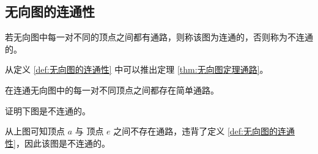 \begin{collections}
\begin{solution}
\begin{center}
            \hspace{3em}
        \end{center}
    \end{solution}
\end{collections}

\subsection{无向图的连通性}
\begin{definition}[无向图的连通性]\label{def:无向图的连通性}
    若无向图中每一对不同的顶点之间都有通路，则称该图为连通的，否则称为不连通的。
\end{definition}

从定义 \ref{def:无向图的连通性} 中可以推出定理 \ref{thm:无向图定理通路}。

\begin{theorem}\label{thm:无向图定理通路}
    在连通无向图中的每一对不同顶点之间都存在简单通路。
\end{theorem}

\begin{collections}
    \begin{example}
        证明下图是不连通的。
        \begin{center}
        \end{center}
    \end{example}
    \begin{solution}
        从上图可知顶点 $a$ 与 顶点 $e$ 之间不存在通路，违背了定义 \ref{def:无向图的连通性}，因此该图是不连通的。
    \end{solution}
\end{collections}
